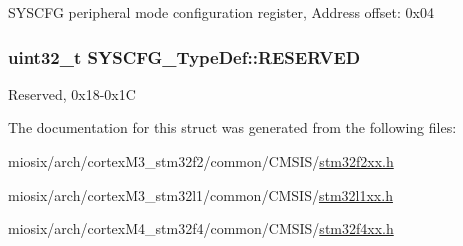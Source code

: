 S\-Y\-S\-C\-F\-G peripheral mode configuration register, Address offset\-: 0x04 \hypertarget{struct_s_y_s_c_f_g___type_def_a2c8da921a5c327428a03507ed299a37f}{
\subsubsection[{R\-E\-S\-E\-R\-V\-E\-D}]{\setlength{\rightskip}{0pt plus 5cm}uint32\-\_\-t S\-Y\-S\-C\-F\-G\-\_\-\-Type\-Def\-::\-R\-E\-S\-E\-R\-V\-E\-D}}\label{struct_s_y_s_c_f_g___type_def_a2c8da921a5c327428a03507ed299a37f}
Reserved, 0x18-\/0x1\-C 

The documentation for this struct was generated from the following files\-:\begin{DoxyCompactItemize}
\item 
miosix/arch/cortex\-M3\-\_\-stm32f2/common/\-C\-M\-S\-I\-S/\hyperlink{stm32f2xx_8h}{stm32f2xx.\-h}\item 
miosix/arch/cortex\-M3\-\_\-stm32l1/common/\-C\-M\-S\-I\-S/\hyperlink{stm32l1xx_8h}{stm32l1xx.\-h}\item 
miosix/arch/cortex\-M4\-\_\-stm32f4/common/\-C\-M\-S\-I\-S/\hyperlink{stm32f4xx_8h}{stm32f4xx.\-h}\end{DoxyCompactItemize}
